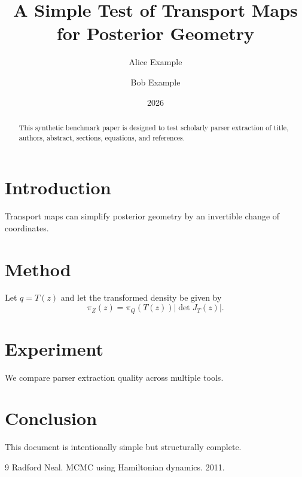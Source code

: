 \documentclass[11pt]{article}
\title{A Simple Test of Transport Maps for Posterior Geometry}
\author{Alice Example \and Bob Example}
\date{2026}
\begin{document}
\maketitle
\begin{abstract}
This synthetic benchmark paper is designed to test scholarly parser extraction of title, authors, abstract, sections, equations, and references.
\end{abstract}
\section{Introduction}
Transport maps can simplify posterior geometry by an invertible change of coordinates.
\section{Method}
Let $q = T(z)$ and let the transformed density be given by
\begin{equation}
\pi_Z(z) = \pi_Q(T(z)) \left|\det J_T(z)\right|.
\end{equation}
\section{Experiment}
We compare parser extraction quality across multiple tools.
\section{Conclusion}
This document is intentionally simple but structurally complete.
\begin{thebibliography}{9}
 Radford Neal. MCMC using Hamiltonian dynamics. 2011.
\end{thebibliography}
\end{document}
